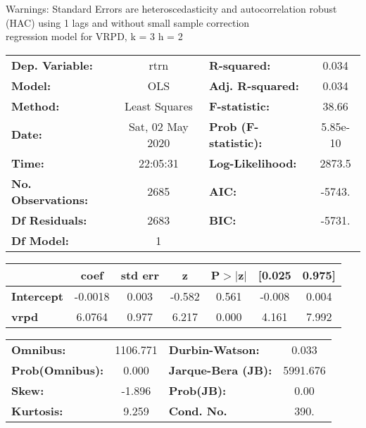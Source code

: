 Warnings: \newline
 [1] Standard Errors are heteroscedasticity and autocorrelation robust (HAC) using 1 lags and without small sample correction\\ 

regression model for VRPD, k = 3 h = 2\begin{center}
\begin{tabular}{lclc}
\toprule
\textbf{Dep. Variable:}    &       rtrn       & \textbf{  R-squared:         } &     0.034   \\
\textbf{Model:}            &       OLS        & \textbf{  Adj. R-squared:    } &     0.034   \\
\textbf{Method:}           &  Least Squares   & \textbf{  F-statistic:       } &     38.66   \\
\textbf{Date:}             & Sat, 02 May 2020 & \textbf{  Prob (F-statistic):} &  5.85e-10   \\
\textbf{Time:}             &     22:05:31     & \textbf{  Log-Likelihood:    } &    2873.5   \\
\textbf{No. Observations:} &        2685      & \textbf{  AIC:               } &    -5743.   \\
\textbf{Df Residuals:}     &        2683      & \textbf{  BIC:               } &    -5731.   \\
\textbf{Df Model:}         &           1      & \textbf{                     } &             \\
\bottomrule
\end{tabular}
\begin{tabular}{lcccccc}
                   & \textbf{coef} & \textbf{std err} & \textbf{z} & \textbf{P$> |$z$|$} & \textbf{[0.025} & \textbf{0.975]}  \\
\midrule
\textbf{Intercept} &      -0.0018  &        0.003     &    -0.582  &         0.561        &       -0.008    &        0.004     \\
\textbf{vrpd}      &       6.0764  &        0.977     &     6.217  &         0.000        &        4.161    &        7.992     \\
\bottomrule
\end{tabular}
\begin{tabular}{lclc}
\textbf{Omnibus:}       & 1106.771 & \textbf{  Durbin-Watson:     } &    0.033  \\
\textbf{Prob(Omnibus):} &   0.000  & \textbf{  Jarque-Bera (JB):  } & 5991.676  \\
\textbf{Skew:}          &  -1.896  & \textbf{  Prob(JB):          } &     0.00  \\
\textbf{Kurtosis:}      &   9.259  & \textbf{  Cond. No.          } &     390.  \\
\bottomrule
\end{tabular}
\end{center}

